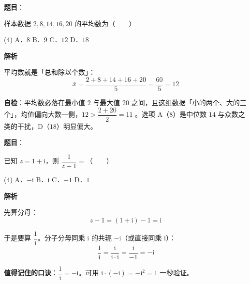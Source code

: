 \begin{answer}

\textbf{题目}：

样本数据 $2,8,14,16,20$ 的平均数为\mbox{（　　）}

\begin{gkopts}(4)
\task A．$8$
\task B．$9$
\task C．$12$
\task D．$18$
\end{gkopts}

\textbf{解析}

平均数就是「总和除以个数」：
\nopagebreak[4]
\[\bar x=\frac{2+8+14+16+20}{5}=\frac{60}{5}=12\]

\begin{gktip}
\textbf{自检}：平均数必落在最小值 $2$ 与最大值 $20$ 之间，且这组数据「小的两个、大的三个」，均值偏向大数一侧，$12>\dfrac{2+20}{2}=11$ 。选项 A（$8$）是中位数 $14$ 与众数之类的干扰，D（$18$）明显偏大。
\end{gktip}


\par\medskip

\end{answer}
\begin{answer}

\textbf{题目}：

已知 $z=1+\mathrm{i}$，则 $\dfrac{1}{z-1}=$\mbox{（　　）}

\begin{gkopts}(4)
\task A．$-\mathrm{i}$
\task B．$\mathrm{i}$
\task C．$-1$
\task D．$1$
\end{gkopts}

\textbf{解析}

先算分母：
\nopagebreak[4]
\[z-1=(1+\mathrm{i})-1=\mathrm{i}\]

于是要算 $\dfrac1{\mathrm{i}}$。分子分母同乘 $\mathrm{i}$ 的共轭 $-\mathrm{i}$（或直接同乘 $\mathrm{i}$）：
\nopagebreak[4]
\[\frac1{\mathrm{i}}=\frac{\mathrm{i}}{\mathrm{i}\cdot\mathrm{i}}=\frac{\mathrm{i}}{-1}=-\mathrm{i}\]

\begin{gktip}
\textbf{值得记住的口诀}：$\dfrac1{\mathrm{i}}=-\mathrm{i}$。可用 $\mathrm{i}\cdot(-\mathrm{i})=-\mathrm{i}^2=1$ 一秒验证。
\end{gktip}


\par\medskip

\end{answer}
